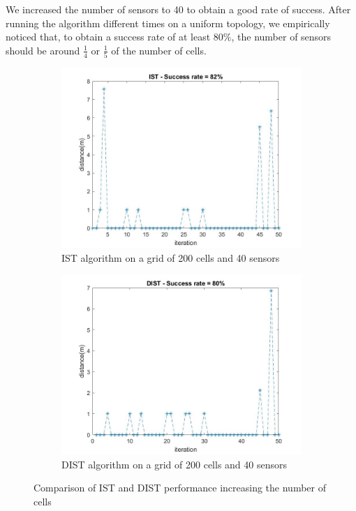 We increased the number of sensors to 40 to obtain a good rate of success. After running the algorithm different times on a 
uniform topology, we empirically noticed that, to obtain a success rate of at least $80\%$, the number of sensors should be 
around $\frac{1}{4}$ or $\frac{1}{5}$ of the number of cells.

\begin{figure}[H]
    \begin{subfigure}{0.45\textwidth}
        \centering
        \includegraphics[width=\textwidth]{img/ist_200_p_40_n.jpg}
        \caption{IST algorithm on a grid of 200 cells and 40 sensors}
    \end{subfigure}
    \hfill
    \begin{subfigure}{0.45\textwidth}
        \centering
        \includegraphics[width=\textwidth]{img/dist_200_p_40_n.jpg}
        \caption{DIST algorithm on a grid of 200 cells and 40 sensors}
    \end{subfigure}
    \caption{Comparison of IST and DIST performance increasing the number of cells}
\end{figure}

